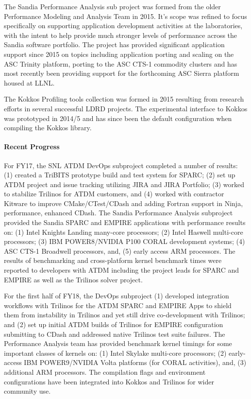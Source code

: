 \noindent
The Sandia Performance Analysis sub project was formed from the older Performance Modeling and Analysis Team in 2015.
It's scope was refined to focus specifically on supporting application development activities at the laboratories, with the intent to help provide much stronger levels of performance across the Sandia software portfolio.
The project has provided significant application support since 2015 on topics including application porting and scaling on the ASC Trinity platform, porting to the ASC CTS-1 commodity clusters and has most recently been providing support for the forthcoming ASC Sierra platform housed at LLNL.

The Kokkos Profiling tools collection was formed in 2015 resulting from research efforts in several successful LDRD projects.
The experimental interface to Kokkos was prototyped in 2014/5 and has since been the default configuration when compiling the Kokkos library.

\paragraph{Recent Progress}

For FY17, the SNL ATDM DevOps subproject completed a number of results: (1) created a TriBITS prototype build and test system for SPARC; (2) set up ATDM project and issue tracking utilizing JIRA and JIRA Portfolio; (3) worked to stabilize Trilinos for ATDM customers, and (4) worked with contractor Kitware to improve CMake/CTest/CDash and adding Fortran support in Ninja, performance, enhanced CDash.
The Sandia Performance Analysis subproject provided the Sandia SPARC and EMPIRE applications with performance results on: (1) Intel Knights Landing many-core processors; (2) Intel Haswell multi-core processors; (3) IBM POWER8/NVIDIA P100 CORAL development systems; (4) ASC CTS-1 Broadwell processors, and, (5) early access ARM processors.
The results of benchmarking and cross-platform kernel benchmark times were reported to developers with ATDM including the project leads for SPARC and EMPIRE as well as the Trilinos solver project.

For the first half of FY18, the DevOps subproject (1) developed integration workflows with Trilinos for the ATDM SPARC and EMPIRE Apps to shield them from instability in Trilinos and yet still drive co-development with Trilinos; and (2) set up initial ATDM builds of Trilinos for EMPIRE configuration submitting to CDash and addressed native Trilinos test suite failures.
The Performance Analysis team has provided benchmark kernel timings for some important classes of kernels on: (1) Intel Skylake multi-core processors; (2) early-access IBM POWER9/NVIDIA Volta platforms (for CORAL activities), and, (3) additional ARM processors.
The compilation flags and environment configurations have been integrated into Kokkos and Trilinos for wider community use.

